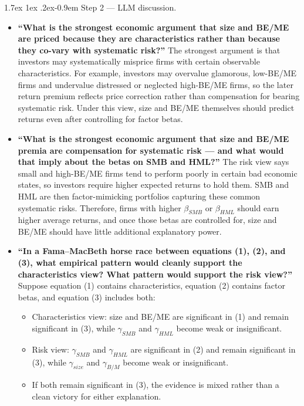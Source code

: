 \documentclass[11pt]{article}
\makeatletter
\renewcommand\paragraph{\@startsection{paragraph}{4}{0pt}%
  {1.7ex \@plus 1ex \@minus .2ex}{-0.9em}%
  {\normalfont\bfseries\normalsize\color{psink}}}
\newenvironment{tight}
  {\begin{itemize}\setlength{\itemsep}{3pt}\setlength{\parskip}{0pt}%
   \setlength{\topsep}{3pt}\setlength{\leftmargini}{1.4em}}
  {\end{itemize}}
\makeatother
\begin{document}
\paragraph{Step 2 --- LLM discussion.}
\begin{tight}
  \item \textbf{``What is the strongest economic argument that size and BE/ME are priced
  because they are characteristics rather than because they co-vary with systematic
  risk?''} The strongest argument is that investors may systematically misprice firms
  with certain observable characteristics. For example, investors may overvalue glamorous,
  low-BE/ME firms and undervalue distressed or neglected high-BE/ME firms, so the later
  return premium reflects price correction rather than compensation for bearing systematic
  risk. Under this view, size and BE/ME themselves should predict returns even after
  controlling for factor betas.
  \item \textbf{``What is the strongest economic argument that size and BE/ME premia are
  compensation for systematic risk --- and what would that imply about the betas on SMB
  and HML?''} The risk view says small and high-BE/ME firms tend to perform poorly in
  certain bad economic states, so investors require higher expected returns to hold them.
  SMB and HML are then factor-mimicking portfolios capturing these common systematic
  risks. Therefore, firms with higher $\beta_{SMB}$ or $\beta_{HML}$ should earn higher
  average returns, and once those betas are controlled for, size and BE/ME should have
  little additional explanatory power.
  \item \textbf{``In a Fama--MacBeth horse race between equations (1), (2), and (3), what
  empirical pattern would cleanly support the characteristics view? What pattern would
  support the risk view?''} Suppose equation (1) contains characteristics, equation (2)
  contains factor betas, and equation (3) includes both:
  \begin{tight}
    \item Characteristics view: size and BE/ME are significant in (1) and remain
    significant in (3), while $\gamma_{SMB}$ and $\gamma_{HML}$ become weak or insignificant.
    \item Risk view: $\gamma_{SMB}$ and $\gamma_{HML}$ are significant in (2) and remain
    significant in (3), while $\gamma_{size}$ and $\gamma_{B/M}$ become weak or insignificant.
    \item If both remain significant in (3), the evidence is mixed rather than a clean
    victory for either explanation.
  \end{tight}
\end{tight}
\end{document}
